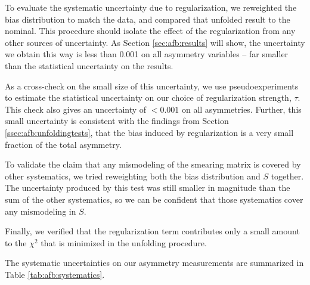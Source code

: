 To evaluate the systematic uncertainty due to regularization, we
reweighted the bias distribution to match the data, and compared that
unfolded result to the nominal. This procedure should isolate the
effect of the regularization from any other sources of
uncertainty. As Section \ref{sec:afb:results} will show, the
uncertainty we obtain this way is less than 0.001 on
all asymmetry variables -- far smaller than the statistical
uncertainty on the results.

As a cross-check on the small size of this uncertainty, we
use pseudoexperiments to estimate the statistical uncertainty on our
choice of regularization strength, $\tau$. This check also gives an
uncertainty of $<0.001$ on all asymmetries. Further, this small
uncertainty is consistent with the findings from Section
\ref{ssec:afb:unfoldingtests}, that the bias induced by regularization
is a very small fraction of the total asymmetry.

To validate the claim that any mismodeling of the smearing matrix is
covered by other systematics, we tried reweighting both the bias
distribution and $S$ together. The uncertainty produced by this test
was still smaller in magnitude than the sum of the other systematics,
so we can be confident that those systematics cover any mismodeling in
$S$.

Finally, we verified that the regularization term contributes only a
small amount to the $\chi^2$ that is minimized in the unfolding
procedure.

The systematic uncertainties on our asymmetry measurements are
summarized in Table \ref{tab:afb:systematics}.


